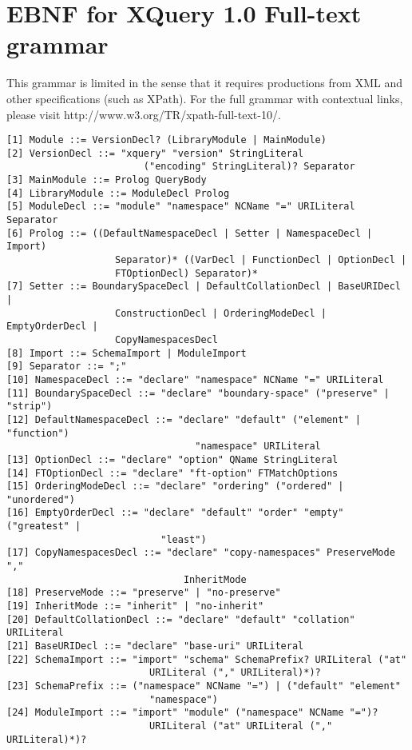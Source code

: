 \chapter{EBNF for XQuery 1.0 Full-text grammar}
\label{appendix:xquery_ebnf}
This grammar is limited in the sense that it requires productions from XML and
other specifications (such as XPath). For the full grammar with contextual
links, please visit http://www.w3.org/TR/xpath-full-text-10/. 

\begin{Verbatim}[frame=none, fontsize=\footnotesize]
[1] Module ::= VersionDecl? (LibraryModule | MainModule)
[2] VersionDecl ::= "xquery" "version" StringLiteral 
                        ("encoding" StringLiteral)? Separator
[3] MainModule ::= Prolog QueryBody
[4] LibraryModule ::= ModuleDecl Prolog
[5] ModuleDecl ::= "module" "namespace" NCName "=" URILiteral Separator
[6] Prolog ::= ((DefaultNamespaceDecl | Setter | NamespaceDecl | Import)
                   Separator)* ((VarDecl | FunctionDecl | OptionDecl |
                   FTOptionDecl) Separator)*
[7] Setter ::= BoundarySpaceDecl | DefaultCollationDecl | BaseURIDecl |
                   ConstructionDecl | OrderingModeDecl | EmptyOrderDecl |
                   CopyNamespacesDecl 
[8] Import ::= SchemaImport | ModuleImport 
[9] Separator ::= ";"
[10] NamespaceDecl ::= "declare" "namespace" NCName "=" URILiteral
[11] BoundarySpaceDecl ::= "declare" "boundary-space" ("preserve" | "strip")
[12] DefaultNamespaceDecl ::= "declare" "default" ("element" | "function")
                                 "namespace" URILiteral
[13] OptionDecl ::= "declare" "option" QName StringLiteral
[14] FTOptionDecl ::= "declare" "ft-option" FTMatchOptions
[15] OrderingModeDecl ::= "declare" "ordering" ("ordered" | "unordered")
[16] EmptyOrderDecl ::= "declare" "default" "order" "empty" ("greatest" |
                           "least")
[17] CopyNamespacesDecl ::= "declare" "copy-namespaces" PreserveMode ","
                               InheritMode 
[18] PreserveMode ::= "preserve" | "no-preserve" 
[19] InheritMode ::= "inherit" | "no-inherit"
[20] DefaultCollationDecl ::= "declare" "default" "collation" URILiteral
[21] BaseURIDecl ::= "declare" "base-uri" URILiteral
[22] SchemaImport ::= "import" "schema" SchemaPrefix? URILiteral ("at"
                         URILiteral ("," URILiteral)*)?
[23] SchemaPrefix ::= ("namespace" NCName "=") | ("default" "element"
                         "namespace")
[24] ModuleImport ::= "import" "module" ("namespace" NCName "=")?
                         URILiteral ("at" URILiteral ("," URILiteral)*)?

\end{Verbatim}
